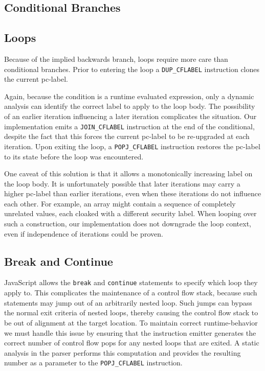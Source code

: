 \subsection{Conditional Branches}
\subsection{Loops}

Because of the implied backwards branch, loops require more care than conditional branches.
Prior to entering the loop a \texttt{DUP\_CFLABEL} instruction clones the current pc-label.

Again, because the condition is a runtime evaluated expression, only a dynamic analysis can identify the correct label to apply to the loop body.
The possibility of an earlier iteration influencing a later iteration complicates the situation.
Our implementation emits a \texttt{JOIN\_CFLABEL} instruction at the end of the conditional, despite the fact that this forces the current pc-label to be re-upgraded at each iteration.
Upon exiting the loop, a \texttt{POPJ\_CFLABEL} instruction restores the pc-label to its state before the loop was encountered.

One caveat of this solution is that it allows a monotonically increasing label on the loop body.
It is unfortunately possible that later iterations may carry a higher pc-label than earlier iterations, even when these iterations do not influence each other.
For example, an array might contain a sequence of completely unrelated values, each cloaked with a different security label.
When looping over such a construction, our implementation does not downgrade the loop context, even if independence of iterations could be proven.

\subsection{Break and Continue}
\label{sec:break-and-continue}
JavaScript allows the \texttt{break} and \texttt{continue} statements to specify which loop they apply to.
This complicates the maintenance of a control flow stack, because such statements may jump out of an arbitrarily nested loop.
Such jumps can bypass the normal exit criteria of nested loops, thereby causing the control flow stack to be out of alignment at the target location.
To maintain correct runtime-behavior we must handle this issue by ensuring that the instruction emitter generates the correct number of control flow pops for any nested loops that are exited.
A static analysis in the parser performs this computation and provides the resulting number as a parameter to the \texttt{POPJ\_CFLABEL} instruction.

